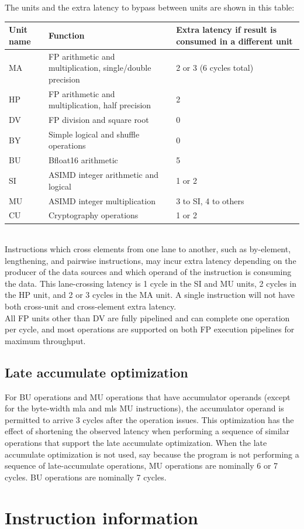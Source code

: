 \documentclass{article}
\begin{document}
The units and the extra latency to bypass between units are shown in this table: \\
\begin{tabular}{|l|l|p{2in}|}
\hline
{\bf Unit name} & {\bf Function}  & {\bf Extra latency if result is consumed in a different unit} \\ \hline
MA & FP arithmetic and multiplication, single/double precision & 2 or 3 (6 cycles total)  \\
HP & FP arithmetic and multiplication, half precision & 2  \\
DV & FP division and square root & 0  \\
BY & Simple logical and shuffle operations & 0  \\
BU & Bfloat16 arithmetic & 5  \\
SI & ASIMD integer arithmetic and logical & 1 or 2  \\
MU & ASIMD integer multiplication & 3 to SI, 4 to others  \\
CU & Cryptography operations & 1 or 2  \\ \hline
\end{tabular}
\\

Instructions which cross elements from one lane to another, such as
 by-element, lengthening, and pairwise instructions, may incur extra
 latency depending on the producer of the data sources and which
 operand of the instruction is consuming the data. This lane-crossing
 latency is 1 cycle in the SI and MU units, 2 cycles in the HP unit,
 and 2 or 3 cycles in the MA unit. A single instruction will not have
 both cross-unit and cross-element extra latency. \\

All FP units other than DV are fully pipelined and can complete one
 operation per cycle, and most operations are supported on both FP
 execution pipelines for maximum throughput. \\

 \subsection{Late accumulate optimization}

 For BU operations and MU operations that have accumulator operands
 (except for the byte-width mla and mls MU instructions), the
 accumulator operand is permitted to arrive 3 cycles after the
 operation issues.  This optimization has the effect of shortening the
 observed latency when performing a sequence of similar operations
 that support the late accumulate optimization.  When the late
 accumulate optimization is not used, say because the program is not
 performing a sequence of late-accumulate operations, MU operations
 are nominally 6 or 7 cycles. BU operations are nominally 7 cycles.


\section{Instruction information}

\end{document}
